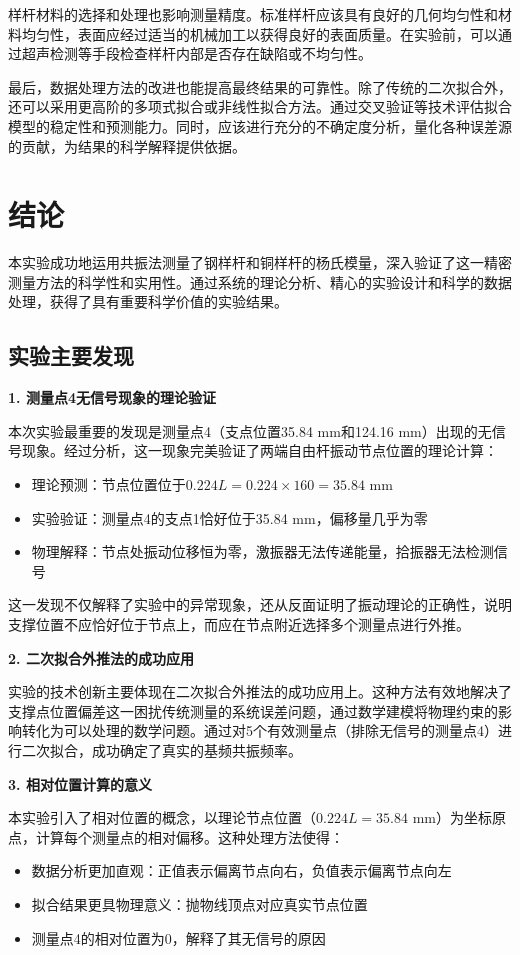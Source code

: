 ﻿\documentclass[12pt,a4paper]{article}
\begin{document}
样杆材料的选择和处理也影响测量精度。标准样杆应该具有良好的几何均匀性和材料均匀性，表面应经过适当的机械加工以获得良好的表面质量。在实验前，可以通过超声检测等手段检查样杆内部是否存在缺陷或不均匀性。

最后，数据处理方法的改进也能提高最终结果的可靠性。除了传统的二次拟合外，还可以采用更高阶的多项式拟合或非线性拟合方法。通过交叉验证等技术评估拟合模型的稳定性和预测能力。同时，应该进行充分的不确定度分析，量化各种误差源的贡献，为结果的科学解释提供依据。

\section{结论}

本实验成功地运用共振法测量了钢样杆和铜样杆的杨氏模量，深入验证了这一精密测量方法的科学性和实用性。通过系统的理论分析、精心的实验设计和科学的数据处理，获得了具有重要科学价值的实验结果。

\subsection{实验主要发现}

\textbf{1. 测量点4无信号现象的理论验证}

本次实验最重要的发现是测量点4（支点位置35.84 mm和124.16 mm）出现的无信号现象。经过分析，这一现象完美验证了两端自由杆振动节点位置的理论计算：
\begin{itemize}
    \item 理论预测：节点位置位于$0.224L = 0.224 \times 160 = 35.84$ mm
    \item 实验验证：测量点4的支点1恰好位于35.84 mm，偏移量几乎为零
    \item 物理解释：节点处振动位移恒为零，激振器无法传递能量，拾振器无法检测信号
\end{itemize}

这一发现不仅解释了实验中的异常现象，还从反面证明了振动理论的正确性，说明支撑位置不应恰好位于节点上，而应在节点附近选择多个测量点进行外推。

\textbf{2. 二次拟合外推法的成功应用}

实验的技术创新主要体现在二次拟合外推法的成功应用上。这种方法有效地解决了支撑点位置偏差这一困扰传统测量的系统误差问题，通过数学建模将物理约束的影响转化为可以处理的数学问题。通过对5个有效测量点（排除无信号的测量点4）进行二次拟合，成功确定了真实的基频共振频率。

\textbf{3. 相对位置计算的意义}

本实验引入了相对位置的概念，以理论节点位置（$0.224L = 35.84$ mm）为坐标原点，计算每个测量点的相对偏移。这种处理方法使得：
\begin{itemize}
    \item 数据分析更加直观：正值表示偏离节点向右，负值表示偏离节点向左
    \item 拟合结果更具物理意义：抛物线顶点对应真实节点位置
    \item 测量点4的相对位置为0，解释了其无信号的原因
\end{itemize}
\end{document}
